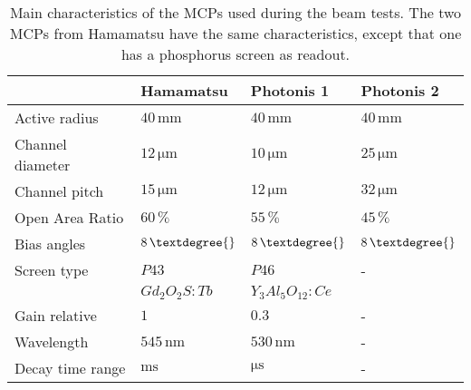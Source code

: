 \begin{table}[ht]
  \centering
  \caption[Main characteristics of the MCPs used during the beam tests]{Main characteristics of the MCPs used during the beam tests. The two MCPs from Hamamatsu have the same characteristics, except that one has a phosphorus screen as readout.}
  \label{chap4:MCP_Phosphor}
  \begin{tabularx}{\linewidth}{lXXX}
    \toprule
                     & Hamamatsu                   & Photonis 1                  & Photonis 2                  \\
    \midrule
    Active radius    & $40\,\mathrm{mm}$           & $40\,\mathrm{mm}$           & $40\,\mathrm{mm}$           \\
    Channel diameter & $12\,\mathrm{\mu m}$        & $10\,\mathrm{\mu m}$        & $25\,\mathrm{\mu m}$        \\
    Channel pitch    & $15\,\mathrm{\mu m}$        & $12\,\mathrm{\mu m}$        & $32\,\mathrm{\mu m}$        \\
    Open Area Ratio  & $60\,\mathrm{\%}$           & $55\,\mathrm{\%}$           & $45\,\mathrm{\%}$           \\
    Bias angles      & $8\,\mathrm{\textdegree{}}$ & $8\,\mathrm{\textdegree{}}$ & $8\,\mathrm{\textdegree{}}$ \\
    \midrule
    Screen type      & $P43$                       & $P46$                       & -                           \\
                     & $Gd_{2}O_{2}S:Tb$           & $Y_{3}Al_{5}O_{12}:Ce$      &                             \\
    Gain relative    & $1$                         & $0.3$                       & -                           \\
    Wavelength       & $545\,\mathrm{nm}$          & $530\,\mathrm{nm}$          & -                           \\
    Decay time range & $\mathrm{ms}$               & $\mathrm{\mu s}$            & -                           \\
    \bottomrule
  \end{tabularx}
\end{table}
